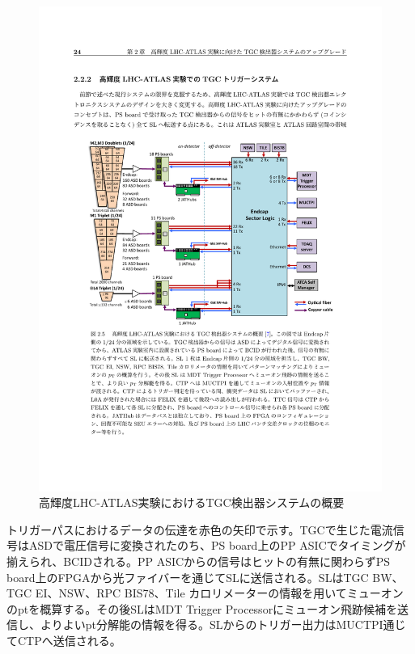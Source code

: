 \begin{figure} 
\centering
\includegraphics[width=16cm]{fig/Intro/TGC_phase2tdaq.pdf}
\caption[高輝度LHC-ATLAS実験におけるTGC検出器システムの概要]{高輝度LHC-ATLAS実験におけるTGC検出器システムの概要\cite{tdr_phase2muon_2017017}}
\label{TGC_phase2tdaq}
\end{figure}

トリガーパスにおけるデータの伝達を赤色の矢印で示す。TGCで生じた電流信号はASDで電圧信号に変換されたのち、PS board上のPP ASICでタイミングが揃えられ、BCIDされる。PP ASICからの信号はヒットの有無に関わらずPS board上のFPGAから光ファイバーを通じてSLに送信される。SLはTGC BW、TGC EI、NSW、RPC BIS78、Tile カロリメーターの情報を用いてミューオンのptを概算する。その後SLはMDT Trigger Processorにミューオン飛跡候補を送信し、よりよいpt分解能の情報を得る。SLからのトリガー出力はMUCTPI通じてCTPへ送信される。

